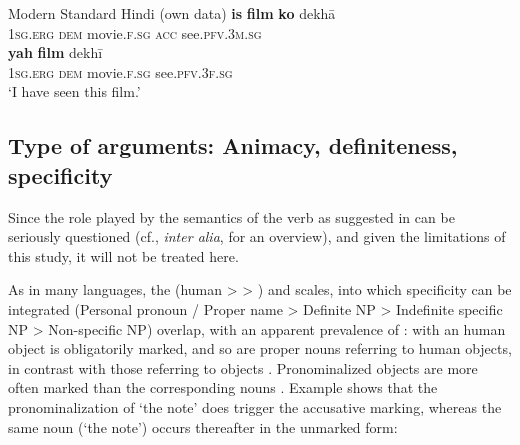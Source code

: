 \documentclass[output=paper]{LSP/langsci}
\begin{document}
\ea Modern Standard Hindi (own data)  \label{10-mo-ex:2}
\ea  \label{10-mo-ex:2a}
 \textbf{is} \textbf{film} \textbf{ko} dekhā\\
\textsc{1sg.erg} \textsc{dem} movie.\textsc{f.sg} \textsc{acc} see.\textsc{pfv.3m.sg}\\

\ex \label{10-mo-ex:2b}
  \textbf{yah} \textbf{film} dekhī\\
\textsc{1sg.erg}  \textsc{dem} movie.\textsc{f.sg} see.\textsc{pfv.3f.sg}\\
\glt `I have seen this film.'
\z
\z

\subsection{Type of arguments: Animacy, definiteness, specificity}
\label{10-mo-sec:2-2}

Since the role played by the semantics of the verb as suggested in \citet[81]{Mohanan1994Argument} can be seriously questioned (cf., \textit{inter alia}, \citealt{Self2012Differential} for an overview), and given the limitations of this study, it will not be treated here.

As in many languages, the  (human >  > ) and  scales, into which specificity can be integrated \citep[132]{Croft2003Typology} (Personal pronoun / Proper name > Definite NP > Indefinite specific NP > Non-specific NP) overlap, with an apparent prevalence of :  with an  human object is obligatorily marked, and so are proper nouns referring to human objects, in contrast with those referring to  objects . 
Pronominalized  objects are more often marked than the corresponding nouns . Example  shows that the pronominalization of ‘the note’ does trigger the accusative marking, whereas the same noun (‘the note’) occurs thereafter in the unmarked form:
\end{document}
